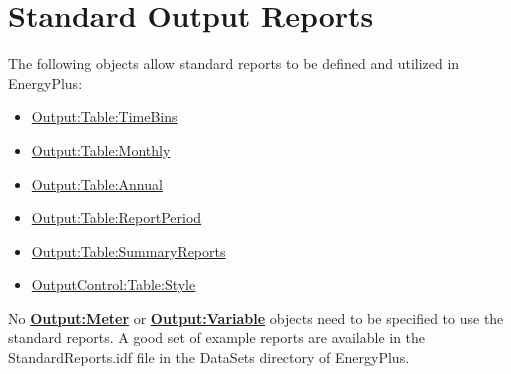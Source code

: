 \chapter{Standard Output Reports}\label{standard-output-reports}

The following objects allow standard reports to be defined and utilized in EnergyPlus:

\begin{itemize}
\item
  \hyperref[outputtabletimebins]{Output:Table:TimeBins}
\item
  \hyperref[outputtablemonthly]{Output:Table:Monthly}
\item
  \hyperref[outputtableannual]{Output:Table:Annual}
\item
  \hyperref[outputtablereportperiod]{Output:Table:ReportPeriod}
\item
  \hyperref[outputtablesummaryreports]{Output:Table:SummaryReports}
\item
  \hyperref[outputcontroltablestyle]{OutputControl:Table:Style}
\end{itemize}

No \textbf{\hyperref[outputmeter-and-outputmetermeterfileonly]{Output:Meter}} or
\textbf{\hyperref[outputvariable]{Output:Variable}} objects need to be specified
to use the standard reports. A good set of example reports are available in the
StandardReports.idf file in the DataSets directory of EnergyPlus.












